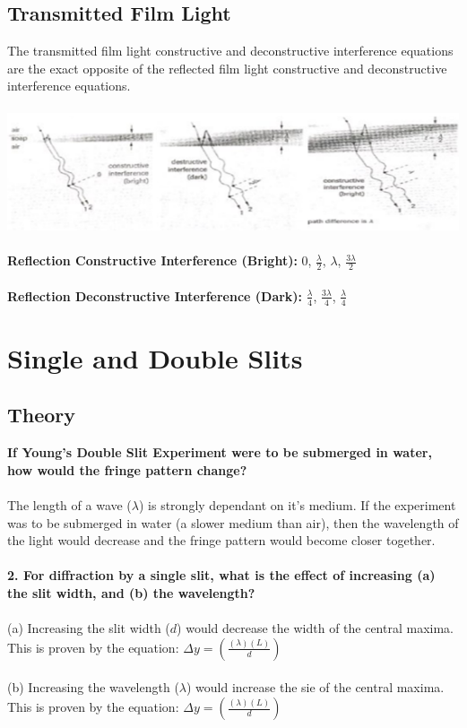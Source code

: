 \documentclass{article}
\begin{document}
\subsection{Transmitted Film Light}
The transmitted film light constructive and deconstructive interference equations are the exact opposite of the reflected film light constructive and deconstructive interference equations.\\\\
\includegraphics[scale=0.5]{images/transmitted_films} \\\\
\noindent \textbf{Reflection Constructive Interference (Bright):} $0$, $\frac{\lambda}{2}$, $\lambda$, $\frac{3\lambda}{2}$ \\\\
\textbf{Reflection Deconstructive Interference (Dark):} $\frac{\lambda}{4}$, $\frac{3\lambda}{4}$, $\frac{\lambda}{4}$ \\

\section{Single and Double Slits}
\subsection{Theory}
\textbf{If Young's Double Slit Experiment were to be submerged in water, how would the fringe pattern change?}\\\\
The length of a wave ($\lambda$) is strongly dependant on it's medium. If the experiment was to be submerged in water (a slower medium than air), then the wavelength of the light would decrease and the fringe pattern would become closer together.\\\\

\noindent\textbf{2. For diffraction by a single slit, what is the effect of increasing (a) the slit width, and (b) the wavelength?}\\\\
(a) Increasing the slit width ($d$) would decrease the width of the central maxima. This is proven by the equation: $\Delta y = \left(\frac{(\lambda)(L)}{d}\right)$\\\\
(b) Increasing the wavelength ($\lambda$) would increase the sie of the central maxima. This is proven by the equation: $\Delta y = \left(\frac{(\lambda)(L)}{d}\right)$\\\\
\end{document}
